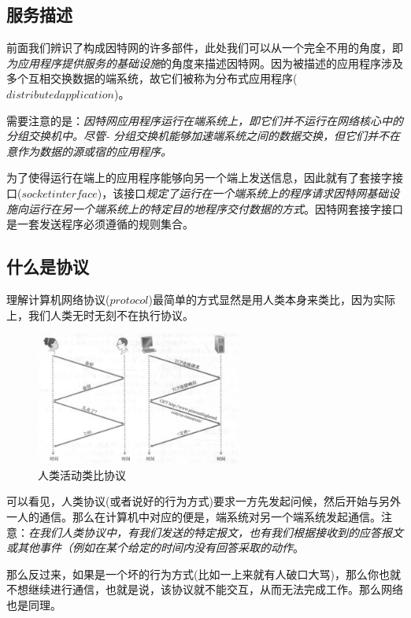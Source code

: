 \subsection{服务描述}

    前面我们辨识了构成因特网的许多部件，此处我们可以从一个完全不用的角度，即\emph{为应用程序提供服务的基础设施}的角度来描述因特网。因为被描述的应用程序涉及多个互相交换数据的端系统，故它们被称为分布式应用程序($distributed application$)。

    需要注意的是：\emph{因特网应用程序运行在端系统上，即它们并不运行在网络核心中的分组交换机中。尽管- 分组交换机能够加速端系统之间的数据交换，但它们并不在意作为数据的源或宿的应用程序。}

    为了使得运行在端上的应用程序能够向另一个端上发送信息，因此就有了套接字接口($socket interface$)，该接口\emph{规定了运行在一个端系统上的程序请求因特网基础设施向运行在另一个端系统上的特定目的地程序交付数据的方式}。因特网套接字接口是一套发送程序必须遵循的规则集合。

\subsection{什么是协议}

    理解计算机网络协议($protocol$)最简单的方式显然是用人类本身来类比，因为实际上，我们人类无时无刻不在执行协议。

\begin{figure}[!htbp]
    \centering
    \includegraphics[width=0.6\textwidth]{image/chapter01/人类活动类比协议.png}
    \caption{人类活动类比协议}
\end{figure}

    可以看见，人类协议(或者说好的行为方式)要求一方先发起问候，然后开始与另外一人的通信。那么在计算机中对应的便是，端系统对另一个端系统发起通信。注意：\emph{在我们人类协议中，有我们发送的特定报文，也有我们根据接收到的应答报文或其他事件（例如在某个给定的时间内没有回答采取的动作}。

    那么反过来，如果是一个坏的行为方式(比如一上来就有人破口大骂)，那么你也就不想继续进行通信，也就是说，该协议就不能交互，从而无法完成工作。那么网络也是同理。

